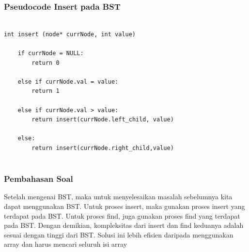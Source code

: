 \begin{frame}[fragile]
\frametitle{Pseudocode Insert pada BST}

\begin{lstlisting}

int insert (node* currNode, int value)

    if currNode = NULL:
        return 0
    
    else if currNode.val = value:
        return 1
        
    else if currNode.val > value:
        return insert(currNode.left_child, value)
        
    else:
        return insert(currNode.right_child,value)
    
\end{lstlisting}
\end{frame}

\begin{frame}
\frametitle{Pembahasan Soal}

Setelah mengenai BST, maka untuk menyelesaikan masalah sebelumnya kita dapat menggunakan BST. Untuk proses insert, maka gunakan proses insert yang terdapat pada BST. Untuk proses find, juga gunakan proses find yang terdapat pada BST.
\newline\newline
Dengan demikian, kompleksitas dari insert dan find keduanya adalah sesuai dengan tinggi dari BST. Solusi ini lebih efisien daripada menggunakan array dan harus mencari seluruh isi array
\end{frame}




